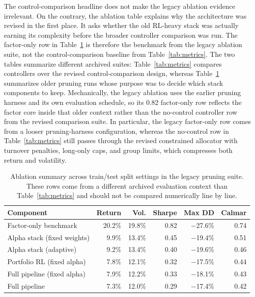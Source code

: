 \documentclass[11pt]{article}
\begin{document}
The control-comparison headline does not make the legacy ablation evidence
irrelevant. On the contrary, the ablation table explains why the architecture
was revised in the first place. It asks whether the old RL-heavy stack was
actually earning its complexity before the broader controller comparison was
run. The factor-only row in Table~\ref{tab:ablation_summary} is therefore the
benchmark from the legacy ablation suite, not the control-comparison baseline
from Table~\ref{tab:metrics}. The two tables summarize different archived
suites: Table~\ref{tab:metrics} compares controllers over the revised
control-comparison design, whereas Table~\ref{tab:ablation_summary} summarizes
older pruning runs whose purpose was to decide which stack components to keep.
Mechanically, the legacy ablation uses the earlier pruning harness and its own
evaluation schedule, so its 0.82 factor-only row reflects the factor core
inside that older context rather than the no-control controller row from the
revised comparison suite. In particular, the legacy factor-only row comes from
a looser pruning-harness configuration, whereas the no-control row in
Table~\ref{tab:metrics} still passes through the revised constrained allocator
with turnover penalties, long-only caps, and group limits, which compresses
both return and volatility.

\begin{table}[t]
\centering
\caption{Ablation summary across train/test split settings in the legacy
pruning suite. These rows come from a different archived evaluation context
than Table~\ref{tab:metrics} and should not be compared numerically line by
line.}
\label{tab:ablation_summary}
\begingroup\small
\begin{tabular}{@{} l r r r r r @{}}
\toprule
\textbf{Component} & \textbf{Return} & \textbf{Vol.} & \textbf{Sharpe} & \textbf{Max DD} & \textbf{Calmar} \\
\midrule
Factor-only benchmark       & 20.2\% & 19.8\% & 0.82 & $-$27.6\% & 0.74 \\
Alpha stack (fixed weights) & 9.9\%  & 13.4\% & 0.45 & $-$19.4\% & 0.51 \\
Alpha stack (adaptive)      & 9.2\%  & 13.4\% & 0.40 & $-$19.6\% & 0.46 \\
Portfolio RL (fixed alpha)  & 7.8\%  & 12.1\% & 0.32 & $-$17.5\% & 0.44 \\
Full pipeline (fixed alpha) & 7.9\%  & 12.2\% & 0.33 & $-$18.1\% & 0.43 \\
Full pipeline               & 7.3\%  & 12.0\% & 0.29 & $-$17.4\% & 0.42 \\
\bottomrule
\end{tabular}
\endgroup
\end{table}
\end{document}
